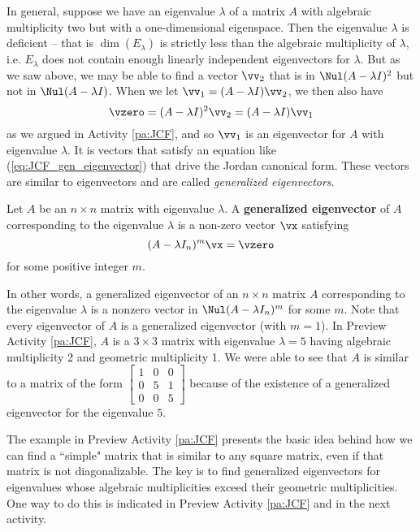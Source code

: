 In general, suppose we have an eigenvalue $\lambda$ of a matrix $A$ with algebraic multiplicity two but with a one-dimensional eigenspace. Then the eigenvalue $\lambda$ is deficient -- that is $\dim(E_{\lambda})$ is strictly less than the algebraic multiplicity of $\lambda$, i.e. $E_{\lambda}$ does not contain enough linearly independent eigenvectors for $\lambda$. But as we saw above, we may be able to find a vector $\vv_2$ that is in $\Nul (A - \lambda I)^2$ but not in $\Nul (A - \lambda I)$. When we let $\vv_1 = (A-\lambda I) \vv_2$, we then also have 
\begin{equation} \label{eq:JCF_gen_eigenvector}
\vzero = (A-\lambda I)^2\vv_2 = (A-\lambda I)\vv_1
\end{equation}
as we argued in Activity \ref{pa:JCF}, and so $\vv_1$ is an eigenvector for $A$ with eigenvalue $\lambda$. It is vectors that satisfy an equation like (\ref{eq:JCF_gen_eigenvector}) that drive the Jordan canonical form. These vectors are similar to eigenvectors and are called \emph{generalized eigenvectors}.

\begin{definition} Let $A$ be an $n \times n$ matrix with eigenvalue $\lambda$. A \textbf{generalized eigenvector} of $A$ corresponding to the eigenvalue $\lambda$ is a non-zero vector $\vx$ satisfying 
\[(A - \lambda I_n)^m \vx = \vzero\]
for some positive integer $m$. 
\end{definition}

In other words, a generalized eigenvector of an $n \times n$ matrix $A$ corresponding to the eigenvalue $\lambda$ is a nonzero vector in $\Nul (A - \lambda I_n)^m$ for some $m$. Note that every eigenvector of $A$ is a generalized eigenvector (with $m=1$). In Preview Activity \ref{pa:JCF}, $A$ is a $3 \times 3$ matrix with eigenvalue $\lambda = 5$ having algebraic multiplicity 2 and geometric multiplicity 1. We were able to see that $A$ is similar to a matrix of the form $\left[ \begin{array}{ccc} 1 &0&0 \\ 0 & 5 &1 \\ 0&0&5\end{array} \right]$ because of the existence of a generalized eigenvector for the eigenvalue $5$. 

The example in Preview Activity \ref{pa:JCF} presents the basic idea behind how we can find a ``simple" matrix that is similar to any square matrix, even if that matrix is not diagonalizable. The key is to find generalized eigenvectors for eigenvalues whose algebraic multiplicities exceed their geometric multiplicities. One way to do this is indicated in Preview Activity \ref{pa:JCF} and in the next activity.


